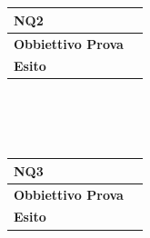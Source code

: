 \documentclass[11pt,titlepage,a4paper]{report}
\begin{document}
\\
\\
\begin{tabular}{||p{4.5cm}||p{7.5cm}||}
\hline
\textbf{\textsf{NQ2}} \\
\hline
{\textbf {Obbiettivo Prova}}& \\ \hline
{\textbf{Esito}}&  \\ \hline
\end{tabular} \\
\\
\\
\begin{tabular}{||p{4.5cm}||p{7.5cm}||}
\hline
\textbf{\textsf{NQ3}} \\
\hline
{\textbf {Obbiettivo Prova}}& \\ \hline
{\textbf{Esito}}&  \\ \hline
\end{tabular} \\
\end{document}
